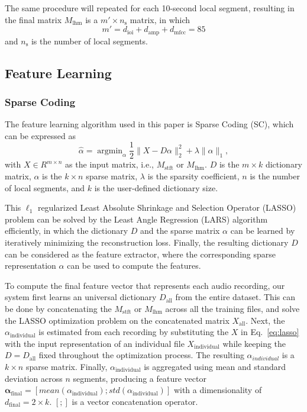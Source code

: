 \documentclass{ws-ijsc}
\begin{document}
The same procedure will repeated for each 10-second local segment, resulting in the final matrix $M_\mathrm{lhm}$ is a $m' \times n_\mathrm{s}$ matrix,  in which 
\begin{equation}
    m' = d_\mathrm{ioi} + d_\mathrm{amp} + d_\mathrm{mfcc} = 85
\end{equation}%
and $n_\mathrm{s}$ is the number of local segments.


\subsection{Feature Learning}\label{subsec:feat_learn}

\subsubsection{Sparse Coding}
\label{subsubsec:sc}
The feature learning algorithm used in this paper is Sparse Coding (SC), which can be expressed as %
\begin{equation}\label{eq:lasso}
\hat{\alpha} = \mathop{\mathrm{argmin}}_\alpha \frac{1}{2} \| X - D\alpha \|_{2}^{2} + \lambda \| \alpha \|_{1}, 
\end{equation}
%
with $X \in R^{ m \times n}$ as the input matrix, i.e., $M_\mathrm{stft}$ or $M_\mathrm{lhm}$. $D$ is the $m \times k$ dictionary matrix, $\alpha$ is the $k \times n$ sparse matrix, $\lambda$ is the sparsity coefficient, $n$ is the number of local segments, and $k$ is the user-defined dictionary size. 

This $\ell_1$ regularized Least Absolute Shrinkage and Selection Operator (LASSO) problem can be solved by the Least Angle Regression (LARS) algorithm efficiently\cite{Efron2004}, in which the dictionary $D$ and the sparse matrix $\alpha$ can be learned by iteratively minimizing the reconstruction loss. Finally, the resulting dictionary $D$ can be considered as the feature extractor, where the corresponding sparse representation $\alpha$ can be used to compute the features. 

To compute the final feature vector that represents each audio recording, our system first learns an universal dictionary $D_\mathrm{all}$ from the entire dataset. This can be done by concatenating the $M_\mathrm{stft}$ or $M_\mathrm{lhm}$ across all the training files, and solve the LASSO optimization problem on the concatenated matrix $X_\mathrm{all}$. %
Next, the $\alpha_\mathrm{individual}$ is estimated from each recording by substituting the $X$ in Eq.~\ref{eq:lasso} with the input representation of an individual file $X_\mathrm{individual}$ while keeping the $D = D_\mathrm{all}$ fixed throughout the optimization process. The resulting $\alpha_{individual}$ is a $k \times n$ sparse matrix. Finally, $\alpha_\mathrm{individual}$ is aggregated using mean and standard deviation across $n$ segments, producing a feature vector $\mathbf{\alpha_\mathrm{final}} = [mean(\alpha_\mathrm{individual}); std(\alpha_\mathrm{individual})]$ with a dimensionality of $d_\mathrm{final} = 2 \times k$. $[ ; ]$ is a vector concatenation operator.
\end{document}
